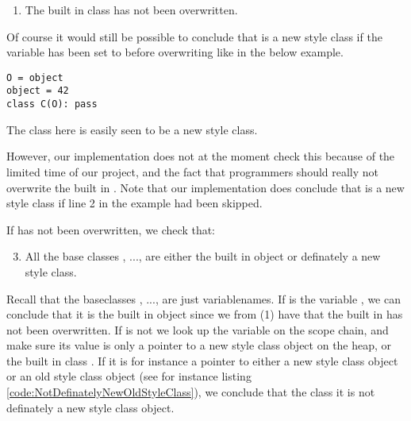 \begin{enumerate}
	\item The built in class  has not been overwritten.
\end{enumerate}

Of course it would still be possible to conclude that  is a new style class if the variable  has been set to  before overwriting  like in the below example.

\begin{listing}[H]
	\begin{verbatim}
O = object
object = 42
class C(O): pass
	\end{verbatim}
	\caption{The class  here is easily seen to be a new style class.}\label{code:ClassOverwrittenObject}
\end{listing}

However, our implementation does not at the moment check this because of the limited time of our project, and the fact that programmers should really not overwrite the built in . Note that our implementation does conclude that  is a new style class if line 2 in the example had been skipped.

If  has not been overwritten, we check that:

\begin{enumerate}
\setcounter{enumi}{2}
	\item All the base classes , ...,  are either the built in object or definately a new style class.
\end{enumerate}

Recall that the baseclasses , ...,  are just variablenames. If  is the variable , we can conclude that it is the built in object since we from (1) have that the built in  has not been overwritten. If  is not  we look up the variable on the scope chain, and make sure its value is only a pointer to a new style class object on the heap, or the built in class . If it is for instance a pointer to either a new style class object or an old style class object (see for instance listing \ref{code:NotDefinatelyNewOldStyleClass}), we conclude that the class  it is not definately a new style class object.

